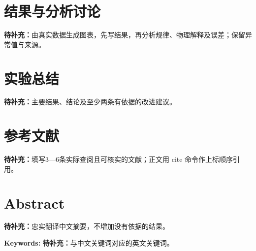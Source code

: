 \documentclass[UTF8,a4paper,11pt,twocolumn,fontset=fandol,scheme=plain]{ctexart}
\newcommand{\ReportTODO}[1]{\textbf{待补充：}#1}
\begin{document}
\section{结果与分析讨论}\label{sec:results}
\ReportTODO{由真实数据生成图表，先写结果，再分析规律、物理解释及误差；保留异常值与来源。}

\section{实验总结}\label{sec:conclusion}
\ReportTODO{主要结果、结论及至少两条有依据的改进建议。}

\section{参考文献}
\ReportTODO{填写3—6条实际查阅且可核实的文献；正文用 cite 命令作上标顺序引用。}

\par\bigskip\noindent\begin{minipage}{\linewidth}
\section*{Abstract}
\ReportTODO{忠实翻译中文摘要，不增加没有依据的结果。}
\par\noindent\textbf{Keywords: }\ReportTODO{与中文关键词对应的英文关键词。}
\end{minipage}\par

\end{document}
